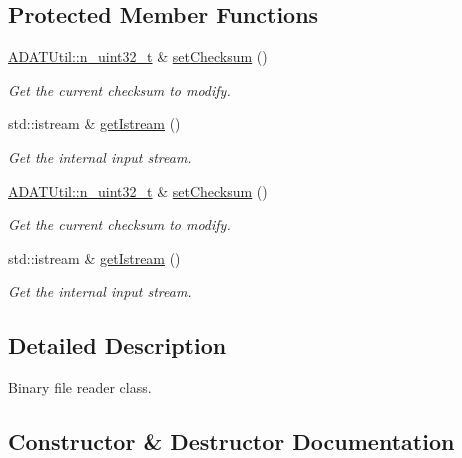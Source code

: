 \subsection*{Protected Member Functions}
\begin{DoxyCompactItemize}
\item 
\mbox{\hyperlink{namespaceADATUtil_ad945a8afa4db2d1f89b731964adae97e}{A\+D\+A\+T\+Util\+::n\+\_\+uint32\+\_\+t}} \& \mbox{\hyperlink{classADATIO_1_1BinaryFileReader_a9279d31577b7fffa174df067c72ebcc4}{set\+Checksum}} ()
\begin{DoxyCompactList}\small\item\em Get the current checksum to modify. \end{DoxyCompactList}\item 
std\+::istream \& \mbox{\hyperlink{classADATIO_1_1BinaryFileReader_ae0985a1157f9baa87580606cfcf98908}{get\+Istream}} ()
\begin{DoxyCompactList}\small\item\em Get the internal input stream. \end{DoxyCompactList}\item 
\mbox{\hyperlink{namespaceADATUtil_ad945a8afa4db2d1f89b731964adae97e}{A\+D\+A\+T\+Util\+::n\+\_\+uint32\+\_\+t}} \& \mbox{\hyperlink{classADATIO_1_1BinaryFileReader_a9279d31577b7fffa174df067c72ebcc4}{set\+Checksum}} ()
\begin{DoxyCompactList}\small\item\em Get the current checksum to modify. \end{DoxyCompactList}\item 
std\+::istream \& \mbox{\hyperlink{classADATIO_1_1BinaryFileReader_ae0985a1157f9baa87580606cfcf98908}{get\+Istream}} ()
\begin{DoxyCompactList}\small\item\em Get the internal input stream. \end{DoxyCompactList}\end{DoxyCompactItemize}


\subsection{Detailed Description}
Binary file reader class. 

\subsection{Constructor \& Destructor Documentation}
\mbox{\label{classADATIO_1_1BinaryFileReader_a77475e594db53a85f7f15050a442faa1}} 
